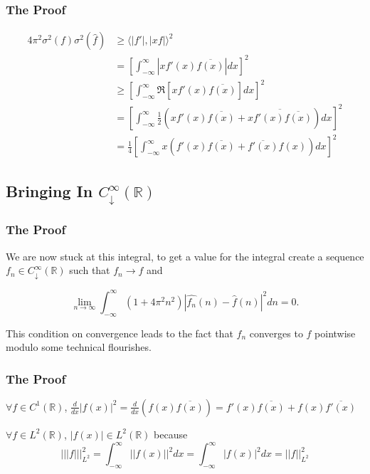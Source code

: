 \documentclass{beamer}
\newcommand{\h}[1]{\hat{#1}}
\newcommand{\R}{\mathbb{R}}
\newcommand{\aabs}[1]{\left\lvert\left\lvert #1\right\rvert\right\rvert}
\newcommand{\abs}[1]{\left\lvert #1\right\rvert}
\newcommand{\angles}[1]{\langle #1 \rangle}
\begin{document}
\begin{frame}
    \frametitle{The Proof}

    \begin{align*}
        4 \pi^2 \sigma^2(f) \sigma^2(\h{f}) &\geq \angles{\abs{f'}, \abs{xf}}^2 \\
        &= \left[\int_{-\infty}^{\infty} \abs{xf'(x)\overline{f(x)}}  dx\right]^2 \\
        &\geq \left[\int_{-\infty}^{\infty}\Re[xf'(x)\overline{f(x)}]  dx\right]^2 \\
        &= \left[\int_{-\infty}^{\infty} \frac{1}{2}(xf'(x)\overline{f(x)} + \overline{xf'(x)\overline{f(x)}})dx\right]^2 \\ 
        &= \frac{1}{4} \left[\int_{-\infty}^{\infty} x(f'(x)\overline{f(x)} + \overline{f'(x)}f(x))dx\right]^2
    \end{align*}

\end{frame}

\subsection{Bringing In $C^{\infty}_{\downarrow}(\R)$ }

\begin{frame}
    \frametitle{The Proof}

    We are now stuck at this integral, to get a value for the integral create a sequence $f_n \in C^{\infty}_{\downarrow}(\R)$ such that $f_n \to f$ and 

    \[
    \lim_{n \to \infty}\int_{-\infty}^{\infty}(1 + 4 \pi^2 n^2) \abs{\h{f_n}(n) - \h{f}(n)}^2 d n = 0. 
    \]

    This condition on convergence leads to the fact that $f_n$ converges to $f$ pointwise modulo some technical flourishes.   
\end{frame}


\begin{frame}
    \frametitle{The Proof}

    \begin{lemma}
        $\forall f \in C^1(\R)$, $\frac{d}{dx} \abs{f(x)}^2 = \frac{d}{dx}(f(x)\overline{f(x)}) = f'(x)\overline{f(x)} + f(x)\overline{f'(x)}$ 
    \end{lemma}

    \begin{lemma}
        $\forall f \in L^2(\R)$, $\abs{f(x)} \in L^2(\R)$ because \[
            \aabs{\abs{f}}_{L^2}^2 = \int_{-\infty}^{\infty} \abs{\abs{f(x)}}^2 dx = \int_{-\infty}^{\infty} \abs{f(x)}^2dx = \aabs{f}_{L^2}^2
        \]   
    \end{lemma}


\end{frame}
\end{document}
